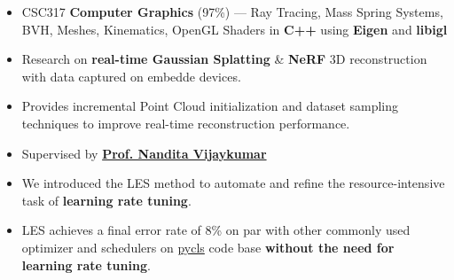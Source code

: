 \documentclass[10pt,a4paper,ragged2e,withhyper]{altacv}
\begin{document}
\begin{paracol}{2}
\begin{itemize}
        \item CSC317 \textbf{Computer Graphics} (97\%) --- Ray Tracing, Mass
              Spring Systems, BVH, Meshes, Kinematics, OpenGL Shaders in
              \textbf{C++} using \textbf{Eigen} and \textbf{libigl}

    \end{itemize}

    \switchcolumn{}

    \begin{itemize}
        \item Research on \textbf{real-time Gaussian Splatting} \& \textbf{NeRF} 3D reconstruction with data captured on embedde devices.
        \item Provides incremental Point Cloud initialization and dataset sampling techniques to improve real-time reconstruction performance.
        \item Supervised by \href{https://www.cs.toronto.edu/~nandita/}{\textbf{Prof. Nandita Vijaykumar}}
    \end{itemize}


    \divider{}

    \begin{itemize}

        \item We introduced the LES method to automate and refine the resource-intensive task of \textbf{learning rate tuning}.

        \item LES achieves a final error rate of 8\% on par with other commonly used
              optimizer and schedulers on \href{https://github.com/facebookresearch/pycls}{pycls} code base
              \textbf{without the need for learning rate tuning}.


\end{itemize}
\end{paracol}
\end{document}
